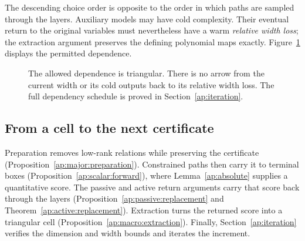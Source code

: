The descending choice order is opposite to the order in which paths
are sampled through the layers. Auxiliary models may have cold
complexity. Their eventual return to the original variables must
nevertheless have a warm \emph{relative width loss}; the extraction
argument preserves the defining polynomial maps exactly.
Figure~\ref{ap:budget-figure} displays the permitted dependence.

\begin{figure}[t]
\centering
{}
\caption{The allowed dependence is triangular. There is no arrow from
the current width or its cold outputs back to its relative width loss.
The full dependency schedule is proved in Section~\ref{ap:iteration}.}
\label{ap:budget-figure}
\end{figure}

\subsection{From a cell to the next certificate}

Preparation removes low-rank relations while preserving the
certificate (Proposition~\ref{ap:major:preparation}). Constrained
paths then carry it to terminal boxes
(Proposition~\ref{ap:scalar:forward}), where
Lemma~\ref{ap:absolute} supplies a quantitative score. The passive
and active return arguments carry that score back through the layers
(Proposition~\ref{ap:passive:replacement} and
Theorem~\ref{ap:active:replacement}). Extraction turns the returned
score into a triangular cell
(Proposition~\ref{ap:macro:extraction}). Finally,
Section~\ref{ap:iteration} verifies the dimension and width bounds
and iterates the increment.

